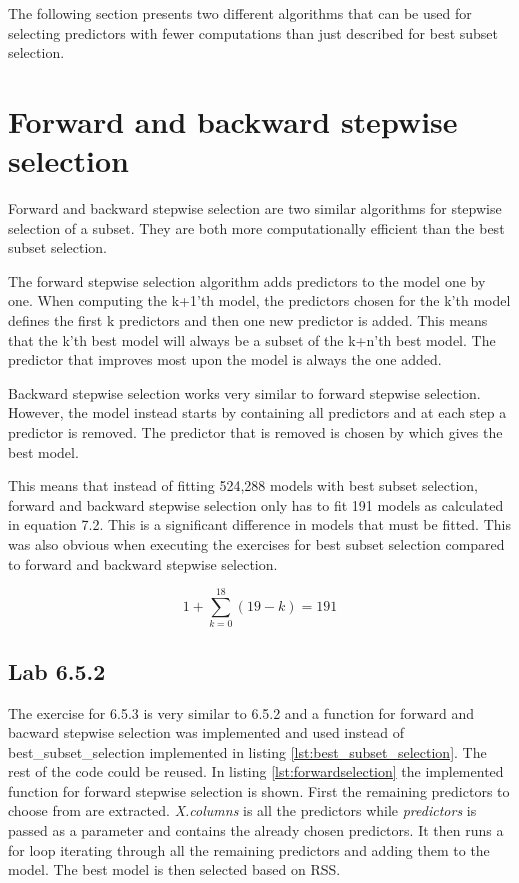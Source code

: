 The following section presents two different algorithms that can be used for selecting predictors with fewer computations than just described for best subset selection.

\section{Forward and backward stepwise selection}
Forward and backward stepwise selection are two similar algorithms for stepwise selection of a subset. They are both more computationally efficient than the best subset selection.

The forward stepwise selection algorithm adds predictors to the model one by one. When computing the k+1'th model, the predictors chosen for the k'th model defines the first k predictors and then one new predictor is added. This means that the k'th best model will always be a subset of the k+n'th best model. The predictor that improves most upon the model is always the one added.

Backward stepwise selection works very similar to forward stepwise selection. However, the model instead starts by containing all predictors and at each step a predictor is removed. The predictor that is removed is chosen by which gives the best model.

This means that instead of fitting 524,288 models with best subset selection, forward and backward stepwise selection only has to fit 191 models as calculated in equation 7.2. This is a significant difference in models that must be fitted.  This was also obvious when executing the exercises for best subset selection compared to forward and backward stepwise selection.

\begin{equation}
1+ \sum_{k=0}^{18}(19-k) = 191
\end{equation}

\subsection{Lab 6.5.2}
The exercise for 6.5.3 is very similar to 6.5.2 and a function for forward and bacward stepwise selection was implemented and used instead of best\_subset\_selection implemented in listing \ref{lst:best_subset_selection}. The rest of the code could be reused. In listing \ref{lst:forwardselection} the implemented function for forward stepwise selection is shown. First the remaining predictors to choose from are extracted. \emph{X.columns} is all the predictors while \emph{predictors} is passed as a parameter and contains the already chosen predictors. It then runs a for loop iterating through all the remaining predictors and adding them to the model. The best model is then selected based on RSS.


